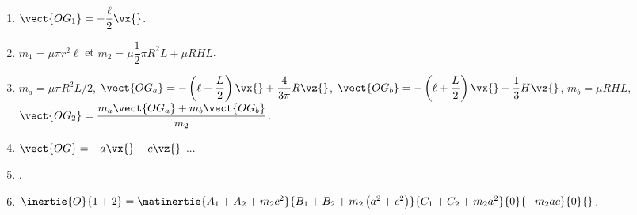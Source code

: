 \begin{solution}
\begin{enumerate}
\item $\vect{OG_1} = -\dfrac{\ell}{2}\vx{}$.
\item $m_1 =\mu \pi r^2 \ell$ et $m_2 = \mu \dfrac{1}{2} \pi R^2 L + \mu RHL$.
\item $m_a = \mu \pi R^2L/2$, $\vect{OG_a}=-\left(\ell+\dfrac{L}{2}\right) \vx{}+\dfrac{4}{3\pi}R \vz{}$, $\vect{OG_b}=-\left(\ell+\dfrac{L}{2}\right) \vx{}-\dfrac{1}{3}H \vz{}$, $m_b = \mu RHL$, $\vect{OG_2} = \dfrac{m_a \vect{OG_a} + m_b \vect{OG_b} }{m_2}$.
\item $\vect{OG} = -a\vx{}-c\vz{}$ ...
\item .
\item $\inertie{O}{1+2} =\matinertie{A_1 + A_2+m_2c^2}{B_1 + B_2 + m_2 \left(a^2+c^2\right)}{C_1 + C_2 + m_2a^2}{0}{-m_2 ac }{0}{}$.
\end{enumerate}
\end{solution}
